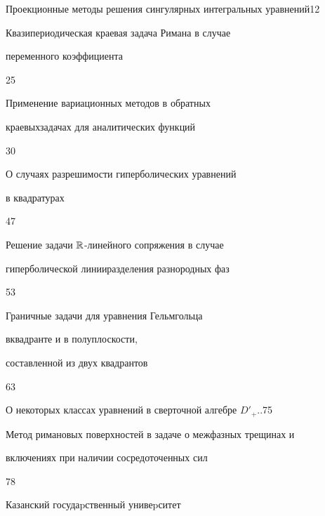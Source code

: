 

{Проекционные методы решения сингулярных интегральных уравнений}{12}




{Квазипериодическая краевая задача Римана в случае\newline  


переменного коэффициента}{25}




{Применение вариационных методов в обратных


краевых\newline задачах для аналитических функций}{30}




{О случаях разрешимости гиперболических уравнений


в квадратурах}{47}




{Решение задачи $\Bbb R$-линейного сопряжения в случае


гиперболической линии\newline разделения разнородных фаз}{53}




{Граничные задачи для уравнения Гельмгольца


в\newline квадранте и в полуплоскости,


составленной из двух квадрантов}{63}




{О некоторых классах уравнений в сверточной алгебре $D'_+$.\;.}{75}




{Метод римановых поверхностей в задаче о межфазных трещинах и\newline 


включениях при наличии сосредоточенных сил}{78}

















\vfill


\noindent\raisebox{2pt}{\copyright} Казанский госудаpственный унивеpситет





